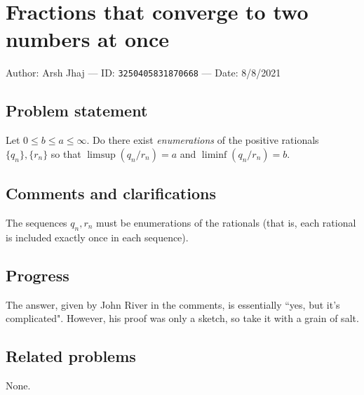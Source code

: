 
\section{Fractions that converge to two numbers at once}

Author: Arsh Jhaj --- ID: \verb`3250405831870668` --- Date: 8/8/2021

\subsection{Problem statement}

Let $0\leq b\leq a\leq\infty$. Do there exist \textit{enumerations} of the positive rationals $\{q_n\},\{r_n\}$ so that $\limsup(q_n/r_n)=a$ and $\liminf(q_n/r_n)=b$.

\subsection{Comments and clarifications}

The sequences $q_n,r_n$ must be enumerations of the rationals (that is, each rational is included exactly once in each sequence).

\subsection{Progress}

The answer, given by John River in the comments, is essentially ``yes, but it's complicated". However, his proof was only a sketch, so take it with a grain of salt.

\subsection{Related problems}

None.

